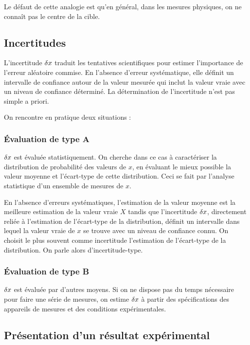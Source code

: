 Le défaut de cette analogie est qu'en général, dans les mesures physiques, on ne connaît pas le centre de la cible.

\subsection{Incertitudes}

L'incertitude \(\fdif{x}\) traduit les tentatives scientifiques pour estimer l'importance de l'erreur aléatoire commise. En l'absence d'erreur systématique, elle définit un intervalle de confiance autour de la valeur mesurée qui inclut la valeur vraie avec un niveau de confiance déterminé. La détermination de l'incertitude n'est pas simple a priori.

On rencontre en pratique deux situations :

\subsubsection{Évaluation de type A}

\(\fdif{x}\) est évaluée statistiquement. On cherche dans ce cas à caractériser la distribution de probabilité des valeurs de \(x\), en évaluant le mieux possible la valeur moyenne et l'écart-type de cette distribution. Ceci se fait par l'analyse statistique d'un ensemble de mesures de \(x\).

En l'absence d'erreurs systématiques, l'estimation de la valeur moyenne est la meilleure estimation de la valeur vraie \(X\) tandis que l'incertitude \(\fdif{x}\), directement reliée à l'estimation de l'écart-type de la distribution, définit un intervalle dans lequel la valeur vraie de \(x\) se trouve avec un niveau de confiance connu. On choisit le plus souvent comme incertitude l'estimation de l'écart-type de la distribution. On parle alors d'incertitude-type.

\subsubsection{Évaluation de type B}

\(\fdif{x}\) est évaluée par d'autres moyens. Si on ne dispose pas du temps nécessaire pour faire une série de mesures, on estime \(\fdif{x}\) à partir des spécifications des appareils de mesures et des conditions expérimentales.

\subsection{Présentation d'un résultat expérimental}

